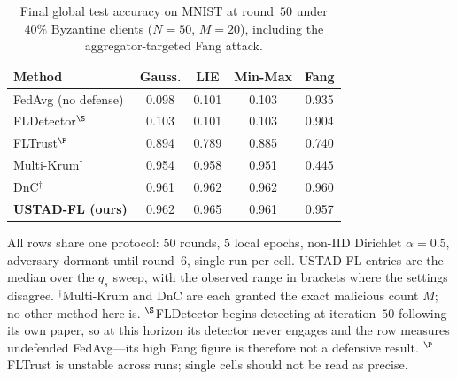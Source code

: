 \documentclass[journal]{IEEEtran}
\begin{document}
\begin{table}[t]
\centering
\caption{Final global test accuracy on MNIST at round~$50$ under $40\%$ Byzantine clients ($N=50$, $M=20$), including the aggregator-targeted Fang attack.}
\label{tab:acc_mnist}
\footnotesize
\setlength{\tabcolsep}{4pt}
\begin{tabular}{@{}lcccc@{}}
\toprule
\textbf{Method} & Gauss. & LIE & Min-Max & \textbf{Fang} \\
\midrule
FedAvg (no defense) & 0.098 & 0.101 & 0.103 & 0.935 \\
FLDetector$^{\S}$ & 0.103 & 0.101 & 0.103 & 0.904 \\
FLTrust$^{\P}$ & 0.894 & 0.789 & 0.885 & 0.740 \\
Multi-Krum$^\dagger$ & 0.954 & 0.958 & 0.951 & 0.445 \\
DnC$^\dagger$ & 0.961 & 0.962 & 0.962 & 0.960 \\
\textbf{USTAD-FL (ours)} & 0.962 & 0.965 & 0.961  & 0.957  \\
\bottomrule
\end{tabular}

\vspace{2pt}
{\footnotesize \raggedright All rows share one protocol: $50$ rounds, $5$ local epochs, non-IID Dirichlet $\alpha=0.5$, adversary dormant until round~$6$, single run per cell. USTAD-FL entries are the median over the $q_s$ sweep, with the observed range in brackets where the settings disagree. $^\dagger$Multi-Krum and DnC are each granted the exact malicious count $M$; no other method here is. $^{\S}$FLDetector begins detecting at iteration~$50$ following its own paper, so at this horizon its detector never engages and the row measures undefended FedAvg---its high Fang figure is therefore not a defensive result. $^{\P}$FLTrust is unstable across runs; single cells should not be read as precise.\par}
\end{table}
\end{document}
